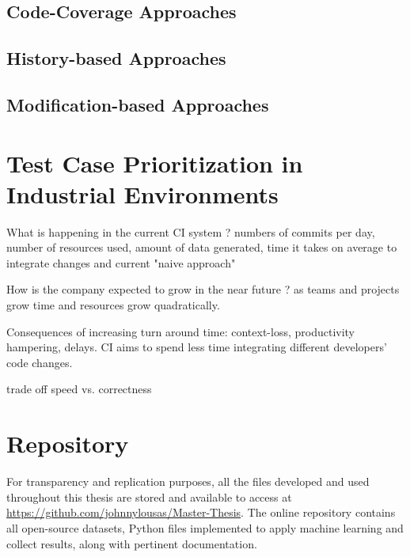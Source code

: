 \subsection{Code-Coverage Approaches}

\subsection{History-based Approaches}

\subsection{Modification-based Approaches}



\section{Test Case Prioritization in Industrial Environments}
\label{section:problem}


What is happening in the current CI system ? numbers of commits per day, number of resources used, amount of data generated, time it takes on average to integrate changes and current "naive  approach"

How is the company expected to grow in the near future ? as teams and projects grow time and resources grow quadratically. 

Consequences of  increasing turn around time: context-loss, productivity hampering, delays. CI aims to  spend less time integrating different developers’ code changes.

trade off speed vs. correctness



\section{Repository}
\label{section:repository}

For transparency and replication purposes, all the files developed and used throughout this thesis are stored and available to access at  \url{https://github.com/johnnylousas/Master-Thesis}. The online repository contains all open-source datasets,  Python files implemented to apply machine learning and collect results, along with pertinent documentation.


